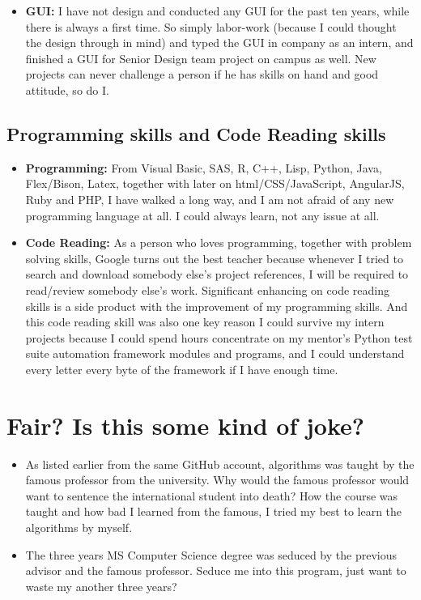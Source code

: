 \documentclass[9pt,b5paper]{article}
\begin{document}
\begin{itemize}
\item \textbf{GUI:} I have not design and conducted any GUI for the past ten years, while there is always a first time. So simply labor-work (because I could thought the design through in mind) and typed the GUI in company as an intern, and finished a GUI for Senior Design team project on campus as well. New projects can never challenge a person if he has skills on hand and good attitude, so do I.
\end{itemize}
\subsection{Programming skills and Code Reading skills}
\label{sec-10-3}
\begin{itemize}
\item \textbf{Programming:} From Visual Basic, SAS, R, C++, Lisp, Python, Java, Flex/Bison, Latex, together with later on html/CSS/JavaScript, AngularJS, Ruby and PHP, I have walked a long way, and I am not afraid of any new programming language at all. I could always learn, not any issue at all.
\item \textbf{Code Reading:} As a person who loves programming, together with problem solving skills, Google turns out the best teacher because whenever I tried to search and download somebody else's project references, I will be required to read/review somebody else's work. Significant enhancing on code reading skills is a side product with the improvement of my programming skills. And this code reading skill was also one key reason I could survive my intern projects because I could spend hours concentrate on my mentor's Python test suite automation framework modules and programs, and I could understand every letter every byte of the framework if I have enough time.
\end{itemize}

\section{Fair? Is this some kind of joke?}
\label{sec-11}
\begin{itemize}
\item As listed earlier from the same GitHub account, algorithms was taught by the famous professor from the university. Why would the famous professor would want to sentence the international student into death? How the course was taught and how bad I learned from the famous, I tried my best to learn the algorithms by myself.
\item The three years MS Computer Science degree was seduced by the previous advisor and the famous professor. Seduce me into this program, just want to waste my another three years?
\end{itemize}
\end{document}
